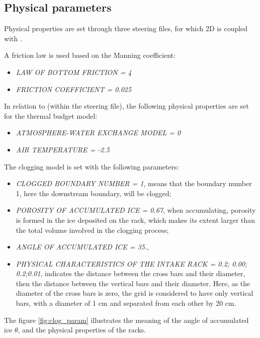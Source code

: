 %
\subsection{Physical parameters}
%
Physical properties are set through three steering files, for which \telemac2D is coupled with \khione.

A friction law is used based on the Manning coefficient:
\begin{itemize}
    \item\textit{LAW OF BOTTOM FRICTION = 4}
    \item\textit{FRICTION COEFFICIENT = 0.025}
\end{itemize}

In relation to \khione (within the \khione steering file), the following physical properties are set for the thermal budget model:
\begin{itemize}
    \item\textit{ATMOSPHERE-WATER EXCHANGE MODEL = 0}
    \item\textit{AIR TEMPERATURE = -2.5}
\end{itemize}

The clogging model is set with the following parameters:
\begin{itemize}
    \item\textit{CLOGGED BOUNDARY NUMBER = 1}, means that the boundary number 1, here the downstream boundary, will be clogged;
    \item\textit{POROSITY OF ACCUMULATED ICE = 0.67}, when accumulating, porosity is formed in the ice deposited on the rack, which makes its extent larger than the total volume involved in the clogging process;
    \item\textit{ANGLE OF ACCUMULATED ICE = 35.},
    \item\textit{PHYSICAL CHARACTERISTICS OF THE INTAKE RACK  = 0.2; 0.00; 0.2;0.01}, indicates the distance between the cross bars and their diameter, then the distance between the vertical bars and their diameter. Here, as the diameter of the cross bars is zero, the grid is considered to have only vertical bars, with a diameter of 1 cm and separated from each other by 20 cm.
\end{itemize}

The figure \ref{fig:clog_param} illustrates the meaning of the angle of accumulated ice $\theta$, and the physical properties of the racks.

